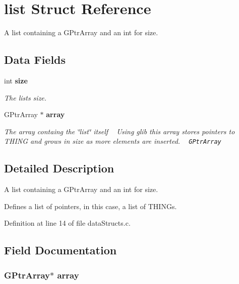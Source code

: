\section{list Struct Reference}
\label{structlist}


A list containing a G\+Ptr\+Array and an int for size.  


\subsection*{Data Fields}
\begin{DoxyCompactItemize}
\item 
int {\bf size}
\begin{DoxyCompactList}\small\item\em The list\textquotesingle{}s size. \end{DoxyCompactList}\item 
G\+Ptr\+Array $\ast$ {\bf array}
\begin{DoxyCompactList}\small\item\em The array containg the \char`\"{}list\char`\"{} itself  ~\newline
 Using glib this array stores pointers to T\+H\+I\+NG and grows in size as more elements are inserted. ~\newline
 {\tt G\+Ptr\+Array  } \end{DoxyCompactList}\end{DoxyCompactItemize}


\subsection{Detailed Description}
A list containing a G\+Ptr\+Array and an int for size. 

Defines a list of pointers, in this case, a list of T\+H\+I\+N\+Gs. 

Definition at line 14 of file data\+Structs.\+c.



\subsection{Field Documentation}
\subsubsection[{array}]{\setlength{\rightskip}{0pt plus 5cm}G\+Ptr\+Array$\ast$ array}\label{structlist_a3167491f9e7a19c8575b456fb7830733}


